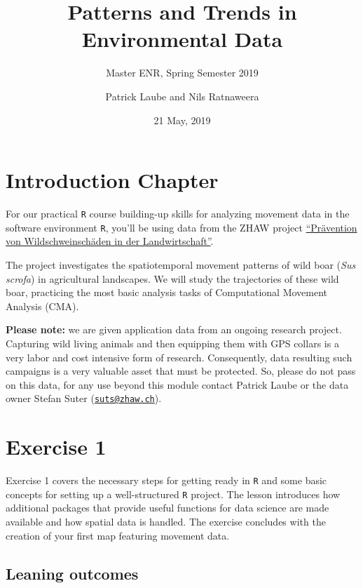 \documentclass[]{book}
\title{Patterns and Trends in Environmental Data}
\subtitle{Master ENR, Spring Semester 2019}
\author{Patrick Laube and Nils Ratnaweera}
\date{21 May, 2019}
\begin{document}
\maketitle

{
\setcounter{tocdepth}{1}
\tableofcontents
}
\chapter*{Introduction Chapter}\label{introduction-chapter}

For our practical \texttt{R} course building-up skills for analyzing
movement data in the software environment \texttt{R}, you'll be using
data from the ZHAW project
\href{https://www.zhaw.ch/de/lsfm/institute-zentren/iunr/integrative-oekologie/wildtiermanagement/referenzprojekte/}{``Prävention
von Wildschweinschäden in der Landwirtschaft''}.

The project investigates the spatiotemporal movement patterns of wild
boar (\emph{Sus scrofa}) in agricultural landscapes. We will study the
trajectories of these wild boar, practicing the most basic analysis
tasks of Computational Movement Analysis (CMA).

\textbf{Please note:} we are given application data from an ongoing
research project. Capturing wild living animals and then equipping them
with GPS collars is a very labor and cost intensive form of research.
Consequently, data resulting such campaigns is a very valuable asset
that must be protected. So, please do not pass on this data, for any use
beyond this module contact Patrick Laube or the data owner Stefan Suter
(\href{mailto:suts@zhaw.ch}{\nolinkurl{suts@zhaw.ch}}).

\chapter{Exercise 1}\label{exercise-1}

Exercise 1 covers the necessary steps for getting ready in \texttt{R}
and some basic concepts for setting up a well-structured \texttt{R}
project. The lesson introduces how additional packages that provide
useful functions for data science are made available and how spatial
data is handled. The exercise concludes with the creation of your first
map featuring movement data.

\section{Leaning outcomes}\label{leaning-outcomes}
\end{document}
